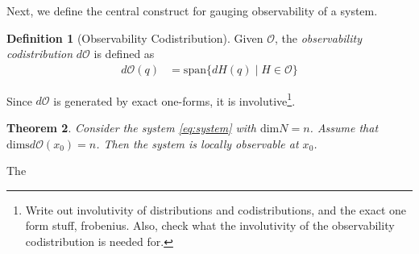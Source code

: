 \documentclass[psamsfonts]{amsart}
\newtheorem{thm}{Theorem}[section]
\theoremstyle{definition}
\newtheorem{defn}[thm]{Definition}
\theoremstyle{remark}
\numberwithin{equation}{section}
\begin{document}
Next, we define the central construct for gauging observability of a system. 
\begin{defn}[Observability Codistribution]
Given $\mathscr{O}$, the \textit{observability codistribution} $d\mathscr{O}$ is defined as
\begin{align}
d\mathscr{O}(q) & = {} \text{span}\{d H(q) \mid H \in \mathscr{O}\}
\end{align}
\end{defn}
Since $d\mathscr{O}$ is generated by exact one-forms, {\color{red}it is involutive}\footnote{{\color{red}Write out involutivity of distributions and codistributions, and the exact one form stuff, frobenius. Also, check what the involutivity of the observability codistribution is needed for.}}. 

\begin{thm}
Consider the system \ref{eq:system} with $\text{dim}N = n$. Assume that $\text{dims}d\mathscr{O}(x_0) = n$. Then the system is locally observable at $x_0$.  
\end{thm}
The 



\end{document}
